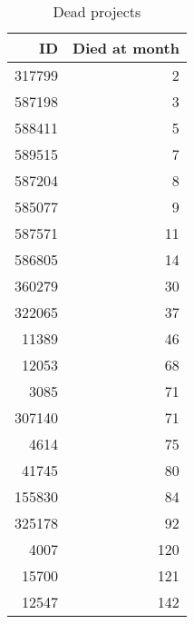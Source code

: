 \begin{wraptable}{l}{40mm}
\caption{Dead projects}\label{table:deads}
\centering
\begin{tabular}{rr}
  \hline
 ID & Died at month \\ 
  \hline
317799 &   2 \\ 
  587198 &   3 \\ 
  588411 &   5 \\ 
  589515 &   7 \\ 
  587204 &   8 \\ 
  585077 &   9 \\ 
  587571 &  11 \\ 
  586805 &  14 \\ 
  360279 &  30 \\ 
  322065 &  37 \\ 
  11389 &  46 \\ 
  12053 &  68 \\ 
  3085 &  71 \\ 
  307140 &  71 \\ 
  4614 &  75 \\ 
  41745 &  80 \\ 
  155830 &  84 \\ 
  325178 &  92 \\ 
  4007 & 120 \\ 
  15700 & 121 \\ 
  12547 & 142 \\  
   \hline
\end{tabular}
\end{wraptable}